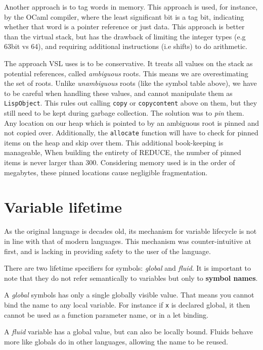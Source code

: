 Another approach is to tag words in memory. This approach is used, for instance, by the OCaml compiler, where the least
significant bit is a tag bit, indicating whether that word is a pointer reference or just data. This approach is better
than the virtual stack, but has the drawback of limiting the integer types (e.g 63bit vs 64), and requiring additional
instructions (i.e shifts) to do arithmetic.

The approach VSL uses is to be conservative. It treats all values on the stack as potential references, called \emph{ambiguous} roots.
This means we are overestimating the set of roots. Unlike \emph{unambiguous} roots (like the symbol table above), we
have to be careful when handling these values, and cannot manipulate them as \texttt{LispObject}. This rules out calling
\texttt{copy} or \texttt{copycontent} above on them, but they still need to be kept during garbage collection. The solution was
to \emph{pin} them. Any location on our heap which is pointed to by an ambiguous root is pinned and not copied over.
Additionally, the \texttt{allocate} function will have to check for pinned items on the heap and skip over them. This
additional book-keeping is manageable, When building the entirety of REDUCE, the number of pinned items is never
larger than 300. Considering memory used is in the order of megabytes, these pinned locations cause negligible
fragmentation.

\section{Variable lifetime}
As the original language is decades old, its mechanism for variable lifecycle is not in line with that of modern languages.
This mechanism was counter-intuitive at first, and is lacking in providing safety to the user of the language.

There are two lifetime specifiers for symbols: \emph{global} and \emph{fluid}. It is important to note that they
do not refer semantically to variables but only to \textbf{symbol names}.

A \emph{global} symbols has only a single globally visible value. That means you cannot bind the name to any local
variable. For instance if \texttt{x} is declared global, it then cannot be used as a function parameter name, or in a
let binding.

A \emph{fluid} variable has a global value, but can also be locally bound. Fluids behave more like globals do
in other languages, allowing the name to be reused.

